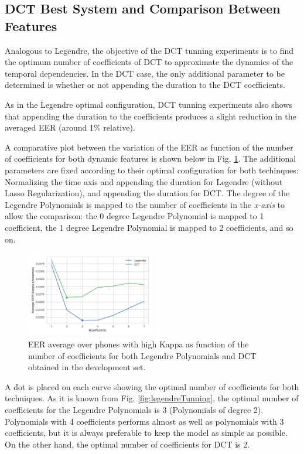 \subsection{DCT Best System and Comparison Between Features}

Analogous to Legendre, the objective of the DCT tunning experiments is to find the optimum
number of coefficients of DCT to approximate the dynamics of the temporal dependencies.
In the DCT case, the only additional parameter to be determined is whether or not appending the
duration to the DCT coefficients.

As in the Legendre optimal configuration, DCT tunning experiments also shows that appending the
duration to the coefficients produces a slight reduction in the averaged EER (around 1\%
relative).

A comparative plot between the variation of the EER as function of the number of coefficients
for both dynamic features is shown below in Fig. \ref{fig:legendreVsDCT}.
The additional parameters are fixed according to their optimal configuration
for both techinques:
Normalizing the time axis and appending the duration for Legendre (without Lasso Regularization),
and appending the duration for DCT. The degree of the Legendre Polynomials is mapped to
the number of coefficients in the \textit{x-axis} to allow the comparison:
the 0 degree Legendre Polynomial is mapped to 1 coefficient, the 1 degree Legendre Polynomial
is mapped to 2 coefficients, and so on.

\begin{figure}[H]
	\centering
	\includegraphics[width=0.5\textwidth]{files/figures/results/legendre-dct/legendre-dct-coefficients.png}
	\caption{EER average over phones with high Kappa as function of the number of coefficients
	for both Legendre Polynomials and DCT obtained in the development set.}
	\label{fig:legendreVsDCT}
\end{figure}

A dot is placed on each curve showing the optimal number of coefficients for both techniques.
As it is known from Fig. \ref{fig:legendreTunning},
the optimal number of coefficients for the
Legendre Polynomials is 3 (Polynomials of degree 2). Polynomials with 4 coefficients performs
almost as well as polynomials with 3 coefficients, but it is always preferable to keep the
model as simple as possible. On the other hand, the optimal number of coefficients for DCT is 2.

